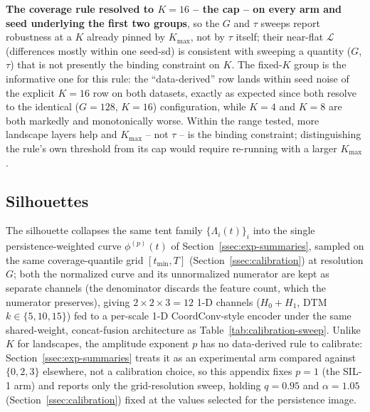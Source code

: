 \documentclass[11pt,letterpaper]{article}
\newcommand{\1}{\mathds{1}}
\theoremstyle{plain}
\theoremstyle{definitioncolon}
\begin{document}
\textbf{The coverage rule resolved to $K=16$ -- the cap -- on every arm and
seed underlying the first two groups}, so the $G$ and $\tau$ sweeps report
robustness at a $K$ already pinned by $K_{\max}$, not by $\tau$ itself; their
near-flat $\mathcal{L}$ (differences mostly within one seed-sd) is consistent
with sweeping a quantity ($G$, $\tau$) that is not presently the binding
constraint on $K$. The fixed-$K$ group is the informative one for this rule:
the ``data-derived'' row lands within seed noise of the explicit $K=16$ row
on both datasets, exactly as expected since both resolve to the identical
($G=128$, $K=16$) configuration, while $K=4$ and $K=8$ are both markedly and
monotonically worse. Within the range tested, more landscape layers help and
$K_{\max}$ -- not $\tau$ -- is the binding constraint; distinguishing the
rule's own threshold from its cap would require re-running with a larger
$K_{\max}$.
\subsection{Silhouettes}
\label{app:calib-silhouette}

The silhouette collapses the same tent family $\{\Lambda_i(t)\}_i$ into the
single persistence-weighted curve $\phi^{(p)}(t)$ of
Section~\ref{ssec:exp-summaries}, sampled on the same coverage-quantile
grid $[t_{\min}, T]$ (Section~\ref{ssec:calibration}) at resolution $G$; both
the normalized curve and its unnormalized numerator are kept as separate
channels (the denominator discards the feature count, which the numerator
preserves), giving $2 \times 2 \times 3 = 12$ 1-D channels ($H_0{+}H_1$,
DTM $k \in \{5,10,15\}$) fed to a per-scale 1-D CoordConv-style encoder under
the same shared-weight, concat-fusion architecture as
Table~\ref{tab:calibration-sweep}. Unlike $K$ for landscapes, the amplitude
exponent $p$ has no data-derived rule to calibrate: Section~\ref{ssec:exp-summaries}
treats it as an experimental arm compared against $\{0,2,3\}$ elsewhere, not a
calibration choice, so this appendix fixes $p=1$ (the SIL-1 arm) and reports
only the grid-resolution sweep, holding $q=0.95$ and $\alpha=1.05$
(Section~\ref{ssec:calibration}) fixed at the values selected for the
persistence image.
\end{document}
